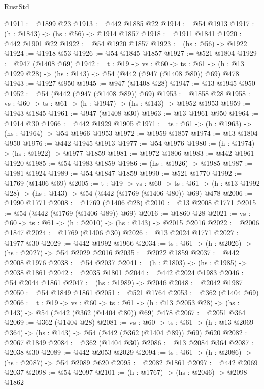 \begin{lexlean}{RustStd}
\begin{coremodule}
@1911 := @1899 @23
@1913 := @442 @1885 @22
@1914 := @54 @1913
@1917 := (h : @1843) -> (hs : @56) -> @1914 @1857
@1918 := @1911 @1841
@1920 := @442 @1901 @22
@1922 := @54 @1920 @1857
@1923 := (hs : @56) -> @1922
@1924 := @1918 @53
@1926 := @54 @1845 @1857
@1927 := @521 @1804
@1929 := @947 (@1408 @69)
@1942 := {t : @19} ->
  {vs : @60} ->
  {ts : @61} -> (h : @13 @1929 @28) -> (hs : @143) -> @54 (@442 (@947 (@1408 @80)) @69) @478
@1943 := @1927 @950
@1945 := @947 (@1408 @28)
@1947 := @13 @1945 @950
@1952 := @54 (@442 (@947 (@1408 @89)) @69)
@1953 := @1858 @28
@1958 := {vs : @60} -> {ts : @61} -> (h : @1947) -> (hs : @143) -> @1952 @1953
@1959 := @1943 @1845
@1961 := @947 (@1408 @30)
@1963 := @13 @1961 @950
@1964 := @1914 @30
@1966 := @442 @1929 @1905
@1971 := {ts : @61} -> (h : @1963) -> (hs : @1964) -> @54 @1966 @1953
@1972 := @1959 @1857
@1974 := @13 @1804 @950
@1976 := @442 @1945 @1913
@1977 := @54 @1976
@1980 := (h : @1974) -> (hs : @1922) -> @1977 @1859
@1981 := @1972 @1806
@1983 := @442 @1961 @1920
@1985 := @54 @1983 @1859
@1986 := (hs : @1926) -> @1985
@1987 := @1981 @1924
@1989 := @54 @1847 @1859
@1990 := @521 @1770
@1992 := @1769 (@1406 @69)
@2005 := {t : @19} ->
  {vs : @60} ->
  {ts : @61} -> (h : @13 @1992 @28) -> (hs : @143) -> @54 (@442 (@1769 (@1406 @80)) @69) @478
@2006 := @1990 @1771
@2008 := @1769 (@1406 @28)
@2010 := @13 @2008 @1771
@2015 := @54 (@442 (@1769 (@1406 @89)) @69)
@2016 := @1860 @28
@2021 := {vs : @60} -> {ts : @61} -> (h : @2010) -> (hs : @143) -> @2015 @2016
@2022 := @2006 @1847
@2024 := @1769 (@1406 @30)
@2026 := @13 @2024 @1771
@2027 := @1977 @30
@2029 := @442 @1992 @1966
@2034 := {ts : @61} -> (h : @2026) -> (hs : @2027) -> @54 @2029 @2016
@2035 := @2022 @1859
@2037 := @442 @2008 @1976
@2038 := @54 @2037
@2041 := (h : @1803) -> (hs : @1985) -> @2038 @1861
@2042 := @2035 @1801
@2044 := @442 @2024 @1983
@2046 := @54 @2044 @1861
@2047 := (hs : @1989) -> @2046
@2048 := @2042 @1987
@2050 := @54 @1849 @1861
@2051 := @521 @1764
@2053 := @362 (@1404 @69)
@2066 := {t : @19} ->
  {vs : @60} ->
  {ts : @61} -> (h : @13 @2053 @28) -> (hs : @143) -> @54 (@442 (@362 (@1404 @80)) @69) @478
@2067 := @2051 @364
@2069 := @362 (@1404 @28)
@2081 := {vs : @60} ->
  {ts : @61} -> (h : @13 @2069 @364) -> (hs : @143) -> @54 (@442 (@362 (@1404 @89)) @69) @620
@2082 := @2067 @1849
@2084 := @362 (@1404 @30)
@2086 := @13 @2084 @364
@2087 := @2038 @30
@2089 := @442 @2053 @2029
@2094 := {ts : @61} -> (h : @2086) -> (hs : @2087) -> @54 @2089 @620
@2095 := @2082 @1861
@2097 := @442 @2069 @2037
@2098 := @54 @2097
@2101 := (h : @1767) -> (hs : @2046) -> @2098 @1862

\end{coremodule}
\end{lexlean}
